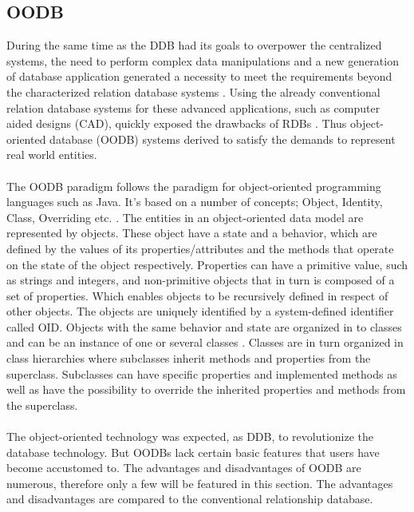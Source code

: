 \documentclass{cslthse-msc}
\begin{document}
\subsection{OODB}
During the same time as the DDB had its goals to overpower the centralized systems, the need to perform complex data manipulations and a new generation of database application generated a necessity to meet the requirements beyond the characterized relation database systems \cite{OODBMS}. Using the already conventional relation database systems for these advanced applications, such as computer aided designs (CAD), quickly exposed the drawbacks of RDBs \cite{OODBMSshortcomings}. Thus object-oriented database (OODB) systems derived to satisfy the demands to represent real world entities.\\\\
The OODB paradigm follows the paradigm for object-oriented programming languages such as Java. It's based on a number of concepts; Object, Identity, Class, Overriding etc. \cite{OODBMSparadigms}. The entities in an object-oriented data model are represented by objects. These object have a state and a behavior, which are defined by the values of its properties/attributes and the methods that operate on the state of the object respectively. Properties can have a primitive value, such as strings and integers, and non-primitive objects that in turn is composed of a set of properties. Which enables objects to be recursively defined in respect of other objects. The objects are uniquely identified by a system-defined identifier called OID. Objects with the same behavior and state are organized in to classes and can be an instance of one or several classes \cite{OODBMSclasses}. Classes are in turn organized in class hierarchies where subclasses inherit methods and properties from the superclass. Subclasses can have specific properties and implemented methods as well as have the possibility to override the inherited properties and methods from the superclass.\\\\
The object-oriented technology was expected, as DDB, to revolutionize the database technology. But OODBs lack certain basic features that users have become accustomed to. 
The advantages and disadvantages of OODB are numerous, therefore only a few will be featured in this section. The advantages and disadvantages are compared to the conventional relationship database.
\end{document}
